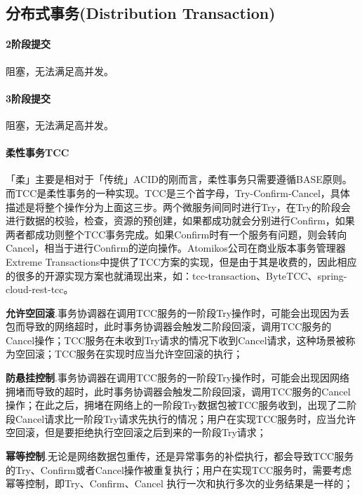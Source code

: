 \documentclass[../../../interview-questions.tex]{subfiles}
\begin{document}
\subsection{分布式事务(Distribution Transaction)}

\paragraph{2阶段提交}

阻塞，无法满足高并发。

\paragraph{3阶段提交}

阻塞，无法满足高并发。

\paragraph{柔性事务TCC}

「柔」主要是相对于「传统」ACID的刚而言，柔性事务只需要遵循BASE原则。而TCC是柔性事务的一种实现。TCC是三个首字母，Try-Confirm-Cancel，具体描述是将整个操作分为上面这三步。两个微服务间同时进行Try，在Try的阶段会进行数据的校验，检查，资源的预创建，如果都成功就会分别进行Confirm，如果两者都成功则整个TCC事务完成。如果Confirm时有一个服务有问题，则会转向Cancel，相当于进行Confirm的逆向操作。Atomikos公司在商业版本事务管理器Extreme Transactions中提供了TCC方案的实现，但是由于其是收费的，因此相应的很多的开源实现方案也就涌现出来，如：tcc-transaction、ByteTCC、spring-cloud-rest-tcc。

\textbf{允许空回滚}.事务协调器在调用TCC服务的一阶段Try操作时，可能会出现因为丢包而导致的网络超时，此时事务协调器会触发二阶段回滚，调用TCC服务的Cancel操作；TCC服务在未收到Try请求的情况下收到Cancel请求，这种场景被称为空回滚；TCC服务在实现时应当允许空回滚的执行；

\textbf{防悬挂控制}.事务协调器在调用TCC服务的一阶段Try操作时，可能会出现因网络拥堵而导致的超时，此时事务协调器会触发二阶段回滚，调用TCC服务的Cancel操作；在此之后，拥堵在网络上的一阶段Try数据包被TCC服务收到，出现了二阶段Cancel请求比一阶段Try请求先执行的情况；用户在实现TCC服务时，应当允许空回滚，但是要拒绝执行空回滚之后到来的一阶段Try请求；

\textbf{幂等控制}.无论是网络数据包重传，还是异常事务的补偿执行，都会导致TCC服务的Try、Confirm或者Cancel操作被重复执行；用户在实现TCC服务时，需要考虑幂等控制，即Try、Confirm、Cancel 执行一次和执行多次的业务结果是一样的；
\end{document}
